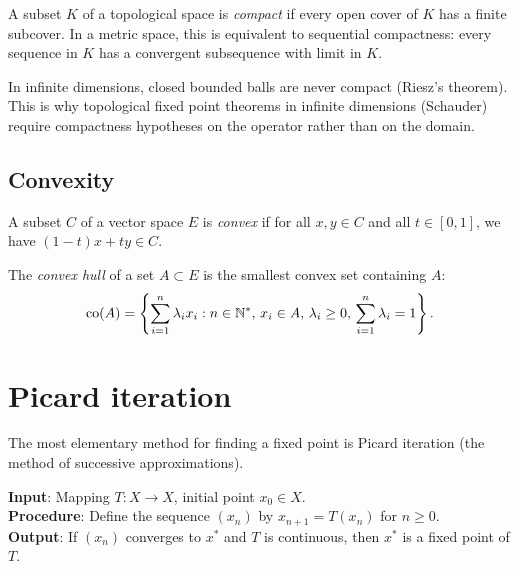 \begin{definition}[Compactness]
A subset $K$ of a topological space is \emph{compact} if every open cover of
$K$ has a finite subcover. In a metric space, this is equivalent to sequential
compactness: every sequence in $K$ has a convergent subsequence with limit
in $K$.
\end{definition}

\begin{remark}
In infinite dimensions, closed bounded balls are never compact (Riesz's theorem).
This is why topological fixed point theorems in infinite dimensions (Schauder)
require compactness hypotheses on the operator rather than on the domain.
\end{remark}

\subsection{Convexity}

\begin{definition}
A subset $C$ of a vector space $E$ is \emph{convex} if for all $x, y \in C$
and all $t \in [0,1]$, we have $(1-t)x + ty \in C$.
\end{definition}

\begin{definition}
The \emph{convex hull} of a set $A \subset E$ is the smallest convex set
containing $A$:
\[
    \mathrm{co}(A) = \left\{ \sum_{i=1}^n \lambda_i x_i : n \in \mathbb{N}^*,
    \, x_i \in A, \, \lambda_i \geq 0, \, \sum_{i=1}^n \lambda_i = 1 \right\}.
\]
\end{definition}

\section{Picard iteration}

The most elementary method for finding a fixed point is Picard iteration
(the method of successive approximations).

\begin{algorithme}[title=\textbf{Picard iteration}]
\textbf{Input}: Mapping $T : X \to X$, initial point $x_0 \in X$. \\
\textbf{Procedure}: Define the sequence $(x_n)$ by $x_{n+1} = T(x_n)$ for $n \geq 0$. \\
\textbf{Output}: If $(x_n)$ converges to $x^*$ and $T$ is continuous, then $x^*$ is a fixed point of $T$.
\end{algorithme}

